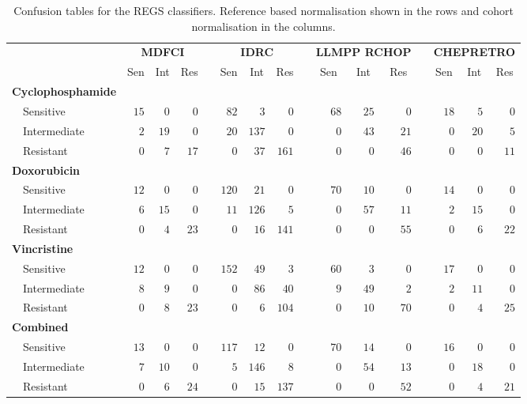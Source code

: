 \documentclass{article}
\begin{document}
\begin{table}[!tbp]
\small
\caption{Confusion tables for the REGS classifiers.
Reference based normalisation shown in the rows and cohort normalisation in the columns.\label{tab:confusiondrugreference}}
\begin{center}
\begin{tabular}{lrrrcrrrcrrrcrrr}
\hline\hline
\multicolumn{1}{l}{\bfseries  }&\multicolumn{3}{c}{\bfseries MDFCI}&\multicolumn{1}{c}{\bfseries }&\multicolumn{3}{c}{\bfseries IDRC}&\multicolumn{1}{c}{\bfseries }&\multicolumn{3}{c}{\bfseries LLMPP RCHOP}&\multicolumn{1}{c}{\bfseries }&\multicolumn{3}{c}{\bfseries CHEPRETRO}\tabularnewline
\cline{2-4} \cline{6-8} \cline{10-12} \cline{14-16}
\multicolumn{1}{l}{}&\multicolumn{1}{c}{Sen}&\multicolumn{1}{c}{Int}&\multicolumn{1}{c}{Res}&\multicolumn{1}{c}{}&\multicolumn{1}{c}{Sen}&\multicolumn{1}{c}{Int}&\multicolumn{1}{c}{Res}&\multicolumn{1}{c}{}&\multicolumn{1}{c}{Sen}&\multicolumn{1}{c}{Int}&\multicolumn{1}{c}{Res}&\multicolumn{1}{c}{}&\multicolumn{1}{c}{Sen}&\multicolumn{1}{c}{Int}&\multicolumn{1}{c}{Res}\tabularnewline
\hline
{\bfseries Cyclophosphamide}&&&&&&&&&&&&&&&\tabularnewline
~~Sensitive&$15$&$ 0$&$ 0$&&$ 82$&$  3$&$  0$&&$68$&$25$&$ 0$&&$18$&$ 5$&$ 0$\tabularnewline
~~Intermediate&$ 2$&$19$&$ 0$&&$ 20$&$137$&$  0$&&$ 0$&$43$&$21$&&$ 0$&$20$&$ 5$\tabularnewline
~~Resistant&$ 0$&$ 7$&$17$&&$  0$&$ 37$&$161$&&$ 0$&$ 0$&$46$&&$ 0$&$ 0$&$11$\tabularnewline
\hline
{\bfseries Doxorubicin}&&&&&&&&&&&&&&&\tabularnewline
~~Sensitive&$12$&$ 0$&$ 0$&&$120$&$ 21$&$  0$&&$70$&$10$&$ 0$&&$14$&$ 0$&$ 0$\tabularnewline
~~Intermediate&$ 6$&$15$&$ 0$&&$ 11$&$126$&$  5$&&$ 0$&$57$&$11$&&$ 2$&$15$&$ 0$\tabularnewline
~~Resistant&$ 0$&$ 4$&$23$&&$  0$&$ 16$&$141$&&$ 0$&$ 0$&$55$&&$ 0$&$ 6$&$22$\tabularnewline
\hline
{\bfseries Vincristine}&&&&&&&&&&&&&&&\tabularnewline
~~Sensitive&$12$&$ 0$&$ 0$&&$152$&$ 49$&$  3$&&$60$&$ 3$&$ 0$&&$17$&$ 0$&$ 0$\tabularnewline
~~Intermediate&$ 8$&$ 9$&$ 0$&&$  0$&$ 86$&$ 40$&&$ 9$&$49$&$ 2$&&$ 2$&$11$&$ 0$\tabularnewline
~~Resistant&$ 0$&$ 8$&$23$&&$  0$&$  6$&$104$&&$ 0$&$10$&$70$&&$ 0$&$ 4$&$25$\tabularnewline
\hline
{\bfseries Combined}&&&&&&&&&&&&&&&\tabularnewline
~~Sensitive&$13$&$ 0$&$ 0$&&$117$&$ 12$&$  0$&&$70$&$14$&$ 0$&&$16$&$ 0$&$ 0$\tabularnewline
~~Intermediate&$ 7$&$10$&$ 0$&&$  5$&$146$&$  8$&&$ 0$&$54$&$13$&&$ 0$&$18$&$ 0$\tabularnewline
~~Resistant&$ 0$&$ 6$&$24$&&$  0$&$ 15$&$137$&&$ 0$&$ 0$&$52$&&$ 0$&$ 4$&$21$\tabularnewline
\hline
\end{tabular}
\end{center}
\end{table}
\end{document}
